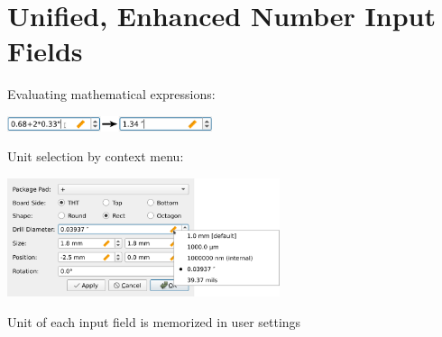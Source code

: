 \section{Unified, Enhanced Number Input Fields}

\begin{frame}{\secname}

  Evaluating mathematical expressions:
  \begin{center}
    \includegraphics[width=6cm]{images/number_input_field_math.png}
  \end{center}
  \vspace*{-5pt}\leavevmode %
  Unit selection by context menu:
  \begin{center}
    \includegraphics[width=8cm]{images/number_input_field_context_menu.png}
  \end{center}
  \vspace*{-5pt}\leavevmode %
  Unit of each input field is memorized in user settings

\end{frame}
